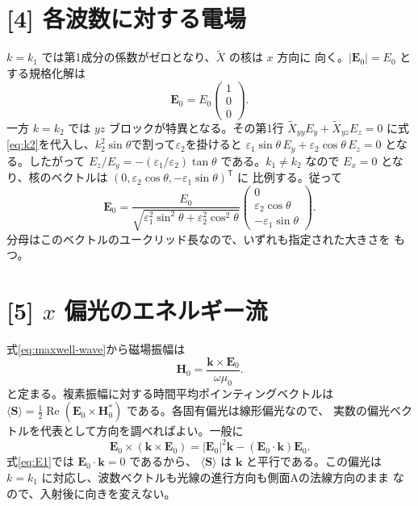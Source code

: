 \documentclass[11pt,a4paper]{article}
\begin{document}
\section*{[4] 各波数に対する電場}
$k=k_1$ では第1成分の係数がゼロとなり、$\tilde X$ の核は $x$ 方向に
向く。$|\boldsymbol{E}_0|=E_0$ とする規格化解は
\begin{equation}
 \boldsymbol{E}_0=E_0\begin{pmatrix}1\\0\\0\end{pmatrix}.
 \label{eq:E1}
\end{equation}
一方 $k=k_2$ では $yz$ ブロックが特異となる。その第1行
$\tilde X_{yy}E_y+\tilde X_{yz}E_z=0$ に式\eqref{eq:k2}を代入し、$k_2^2\sin\theta$で割って$\varepsilon_2$を掛けると
$\varepsilon_1\sin\theta\,E_y+\varepsilon_2\cos\theta\,E_z=0$ となる。したがって
$E_z/E_y=-(\varepsilon_1/\varepsilon_2)\tan\theta$ である。$k_1\ne k_2$ なので $E_x=0$ となり、核のベクトルは
$(0,\varepsilon_2\cos\theta,-\varepsilon_1\sin\theta)^{\mathsf T}$ に
比例する。従って
\begin{equation}
 \boldsymbol{E}_0=\frac{E_0}{\sqrt{\varepsilon_1^2\sin^2\theta+
                                     \varepsilon_2^2\cos^2\theta}}
 \begin{pmatrix}0\\\varepsilon_2\cos\theta\\-\varepsilon_1\sin\theta\end{pmatrix}.
 \label{eq:E2}
\end{equation}
分母はこのベクトルのユークリッド長なので、いずれも指定された大きさを
もつ。

\section*{[5] $x$ 偏光のエネルギー流}
式\eqref{eq:maxwell-wave}から磁場振幅は
\begin{equation}
 \boldsymbol{H}_0=\frac{\boldsymbol{k}\times\boldsymbol{E}_0}{\omega\mu_0}.
 \label{eq:H0}
\end{equation}
と定まる。複素振幅に対する時間平均ポインティングベクトルは
$\langle\boldsymbol{S}\rangle=\tfrac12\operatorname{Re}
(\boldsymbol{E}_0\times\boldsymbol{H}_0^*)$ である。各固有偏光は線形偏光なので、
実数の偏光ベクトルを代表として方向を調べればよい。一般に
\begin{equation}
 \boldsymbol{E}_0\times(\boldsymbol{k}\times\boldsymbol{E}_0)
 =|\boldsymbol{E}_0|^2\boldsymbol{k}
  -(\boldsymbol{E}_0\cdot\boldsymbol{k})\boldsymbol{E}_0.
 \label{eq:poynting-identity}
\end{equation}
式\eqref{eq:E1}では $\boldsymbol{E}_0\cdot\boldsymbol{k}=0$ であるから、
$\langle\boldsymbol{S}\rangle$ は $\boldsymbol{k}$ と平行である。この偏光は
$k=k_1$ に対応し、波数ベクトルも光線の進行方向も側面Aの法線方向のまま
なので、入射後に向きを変えない。
\end{document}

